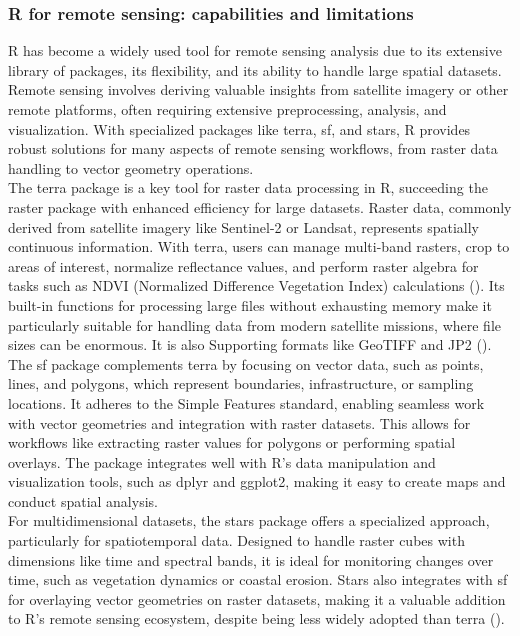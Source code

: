 \documentclass[a4paper,12pt]{article}
\begin{document}
\subsubsection{R for remote sensing: capabilities and limitations}
R has become a widely used tool for remote sensing analysis due to its extensive library of packages, its flexibility, and its ability to handle large spatial datasets. Remote sensing involves deriving valuable insights from satellite imagery or other remote platforms, often requiring extensive preprocessing, analysis, and visualization. With specialized packages like terra, sf, and stars, R provides robust solutions for many aspects of remote sensing workflows, from raster data handling to vector geometry operations.\\
The terra package is a key tool for raster data processing in R, succeeding the raster package with enhanced efficiency for large datasets. Raster data, commonly derived from satellite imagery like Sentinel-2 or Landsat, represents spatially continuous information. With terra, users can manage multi-band rasters, crop to areas of interest, normalize reflectance values, and perform raster algebra for tasks such as NDVI (Normalized Difference Vegetation Index) calculations (\cite{ghosh_remote_2023}). Its built-in functions for processing large files without exhausting memory make it particularly suitable for handling data from modern satellite missions, where file sizes can be enormous. It is also Supporting formats like GeoTIFF and JP2 (\cite{wasser_how_2017}).\\
The sf package complements terra by focusing on vector data, such as points, lines, and polygons, which represent boundaries, infrastructure, or sampling locations. It adheres to the Simple Features standard, enabling seamless work with vector geometries and integration with raster datasets. This allows for workflows like extracting raster values for polygons or performing spatial overlays. The package integrates well with R's data manipulation and visualization tools, such as dplyr and ggplot2, making it easy to create maps and conduct spatial analysis.\\
For multidimensional datasets, the stars package offers a specialized approach, particularly for spatiotemporal data. Designed to handle raster cubes with dimensions like time and spectral bands, it is ideal for monitoring changes over time, such as vegetation dynamics or coastal erosion. Stars also integrates with sf for overlaying vector geometries on raster datasets, making it a valuable addition to R's remote sensing ecosystem, despite being less widely adopted than terra (\cite{ghosh_remote_2023}).\\
\end{document}
